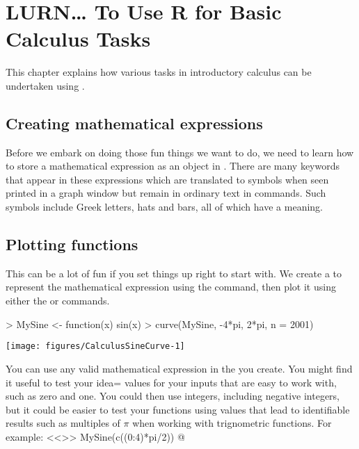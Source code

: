  
\chapter{LURN\ldots{} To Use R for Basic Calculus Tasks} 
\label{Calculus} 
 

 
This chapter explains how various tasks in introductory calculus can be undertaken using \R{}. 
 
 
\section{Creating mathematical expressions} 
 
Before we embark on doing those fun things we want to do, we need to learn how to store a mathematical expression as an object in \R{}. There are many keywords that appear in these expressions which are translated to symbols when seen printed in a graph window but remain in ordinary text in \R{} commands. Such symbols include Greek letters, hats and bars, all of which have a meaning. 
 
\section{Plotting functions} 
 
This can be a lot of fun if you set things up right to start with. We create a  to represent the mathematical expression using the  command, then plot it using either the  or  commands. 
\begin{Schunk}
\begin{Sinput}
> MySine <- function(x){ sin(x)} 
> curve(MySine, -4*pi, 2*pi, n = 2001) 
\end{Sinput}

\texttt{[image: figures/CalculusSineCurve-1]} \end{Schunk}
 
You can use any valid mathematical expression in the  you create. You might find it useful to test your idea= values for your inputs that are easy to work with, such as zero and one. You could then use integers, including negative integers, but  it could be easier to test your functions using values that lead to identifiable results such as multiples of $\pi$ when working with trignometric functions. For example: 
<<>> 
MySine(c((0:4)*pi/2)) 
@ 
 

